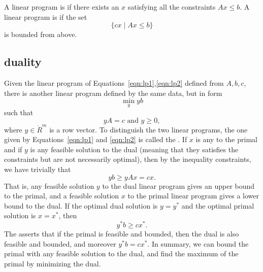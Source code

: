 A linear program is  if there exists an $x$ satisfying
all the constraints $A x \le b$.  A linear program is 
if the set 
\[
\{c x \mid A x \le b\}
\]
is bounded from above.

\subsection{duality}


Given the linear program of Equations~\ref{eqn:lp1},\ref{eqn:lp2}
defined from $A,b,c$, there is another linear program defined by
the same data, but in  form
\begin{equation}
\min_y {y b}
\end{equation}
such that
\begin{equation}
y A = c \text{ and } y \ge 0,
\end{equation}
where $y\in\ring{R}^m$ is a row vector.
To distinguish the two linear programs, the one given by
Equations~\ref{eqn:lp1} and \ref{eqn:lp2} is called the .
If $x$ is any  to the primal and  if
$y$ is any feasible solution to the dual (meaning that they satisfies
the constraints but are not necessarily optimal), then by
the inequality constraints, we have trivially that
$$y b \ge y A x = c x.$$
That is, any feasible solution $y$ to the dual linear program gives an
upper bound to the primal, and a feasible solution $x$ to the primal linear program
gives a lower bound to the dual.  If the optimal dual solution is
 $y=y^*$ and the optimal primal solution is $x=x^*$, then 
$$y^* b \ge c x^*.$$
The  asserts that if the primal
is feasible and bounded, then the dual is also feasible and bounded,
and moreover $y^* b = c x^*$.  In summary, we can bound
the primal with any feasible solution to the dual, and find
the maximum of the primal by minimizing the dual.

